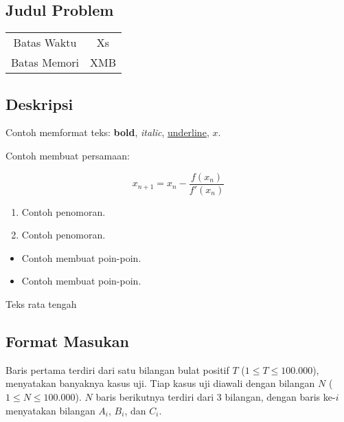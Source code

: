 \documentclass{article}
\begin{document}
\begin{center}

    
    \section*{Judul Problem} %

    \begin{tabular}{ | c c | }
        \hline
        Batas Waktu  & Xs \\    %
        Batas Memori & XMB \\  %
        \hline
    \end{tabular}
\end{center}

\subsection*{Deskripsi}

Contoh memformat teks: \textbf{bold}, \textit{italic}, \underline{underline}, $x$.

Contoh membuat persamaan:

\[ x_{n+1} = x_{n} - \frac{f(x_{n})}{f'(x_{n})} \]

\begin{enumerate}
    \setlength\itemsep{0pt}
    \item Contoh penomoran.
    \item Contoh penomoran.
\end{enumerate}

\begin{itemize}
    \setlength\itemsep{0pt}
    \item Contoh membuat poin-poin.
    \item Contoh membuat poin-poin.
\end{itemize}

\begin{center}
    Teks rata tengah
\end{center}

\subsection*{Format Masukan}

Baris pertama terdiri dari satu bilangan bulat positif $T$ ($1 \leq T \leq 100.000$), menyatakan banyaknya kasus uji.
Tiap kasus uji diawali dengan bilangan $N$ ($1 \leq N \leq 100.000$).
$N$ baris berikutnya terdiri dari 3 bilangan, dengan baris ke-$i$ menyatakan bilangan $A_i$, $B_i$, dan $C_i$.
\end{document}
